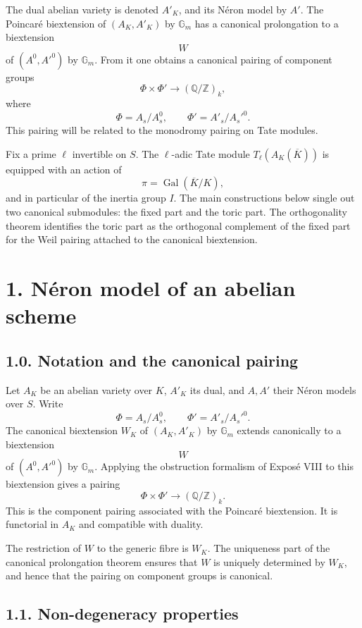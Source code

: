 \documentclass[11pt]{article}
\newcommand{\bZ}{\mathbb Z}
\newcommand{\bQ}{\mathbb Q}
\newcommand{\Gm}{\mathbb G_m}
\begin{document}
The dual abelian variety is denoted \(A'_K\), and its Néron model by \(A'\).
The Poincaré biextension of \((A_K,A'_K)\) by \(\Gm\) has a canonical
prolongation to a biextension
\[
W
\]
of \((A^0,A'^0)\) by \(\Gm\). From it one obtains a canonical pairing of
component groups
\[
\Phi\times\Phi'\longrightarrow (\bQ/\bZ)_k,
\]
where
\[
\Phi=A_s/A_s^0,\qquad \Phi'=A'_s/A_s'^0.
\]
This pairing will be related to the monodromy pairing on Tate modules.

Fix a prime \(\ell\) invertible on \(S\). The \(\ell\)-adic Tate module
\(T_\ell(A_K(\overline K))\) is equipped with an action of
\[
\pi=\operatorname{Gal}(\overline K/K),
\]
and in particular of the inertia group \(I\). The main constructions below
single out two canonical submodules: the fixed part and the toric part. The
orthogonality theorem identifies the toric part as the orthogonal complement of
the fixed part for the Weil pairing attached to the canonical biextension.

\section*{1. Néron model of an abelian scheme}

\subsection*{1.0. Notation and the canonical pairing}

Let \(A_K\) be an abelian variety over \(K\), \(A'_K\) its dual, and \(A,A'\)
their Néron models over \(S\). Write
\[
\Phi=A_s/A_s^0,\qquad \Phi'=A'_s/A_s'^0.
\]
The canonical biextension \(W_K\) of \((A_K,A'_K)\) by \(\Gm\) extends
canonically to a biextension
\[
W
\]
of \((A^0,A'^0)\) by \(\Gm\). Applying the obstruction formalism of Exposé VIII
to this biextension gives a pairing
\[
\Phi\times\Phi'\longrightarrow(\bQ/\bZ)_k.
\]
This is the component pairing associated with the Poincaré biextension. It is
functorial in \(A_K\) and compatible with duality.

The restriction of \(W\) to the generic fibre is \(W_K\). The uniqueness part of
the canonical prolongation theorem ensures that \(W\) is uniquely determined by
\(W_K\), and hence that the pairing on component groups is canonical.

\subsection*{1.1. Non-degeneracy properties}
\end{document}
